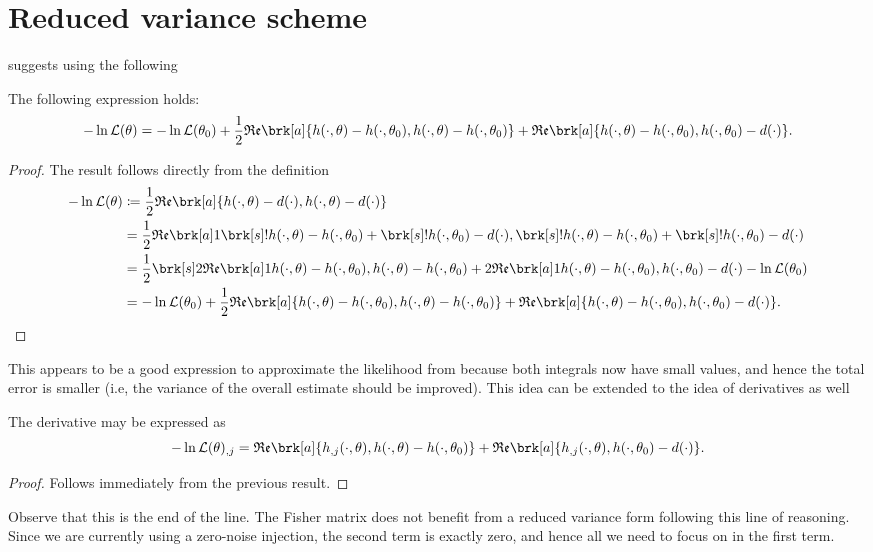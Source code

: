 \section{Reduced variance scheme}
\cite{Cornish_2021} suggests using the following
\begin{proposition}[]\label{}
The following expression holds:
\begin{equation}\label{}
- \ln \like(\theta) = -\ln \like(\theta_0) + \frac{1}{2} \re \brk[a]{h(\cdot,\theta) - h(\cdot,\theta_0), h(\cdot,\theta) - h(\cdot,\theta_0)} + \re \brk[a]{h(\cdot,\theta) - h(\cdot,\theta_0), h(\cdot,\theta_0) - d(\cdot)}.
\end{equation}
\end{proposition}
\begin{proof}
The result follows directly from the definition
\begin{align*}
-\ln \like(\theta) &\defn \frac{1}{2} \re \brk[a]{h(\cdot,\theta) - d(\cdot), h(\cdot,\theta)-d(\cdot)} \\
&= \frac{1}{2} \re \brk[a]1{\brk[s]!{h(\cdot,\theta) - h(\cdot,\theta_0)} + \brk[s]!{h(\cdot, \theta_0) - d(\cdot)}, \brk[s]!{h(\cdot, \theta) - h(\cdot,\theta_0)} + \brk[s]!{h(\cdot,\theta_0) - d(\cdot)}} \\
&= \frac{1}{2} \brk[s]2{\re \brk[a]1{h(\cdot,\theta) - h(\cdot,\theta_0), h(\cdot,\theta) - h(\cdot,\theta_0)} + 2 \re \brk[a]1{h(\cdot,\theta) - h(\cdot,\theta_0), h(\cdot,\theta_0) - d(\cdot)}} - \ln \like (\theta_0) \\
&= -\ln \like(\theta_0) + \frac{1}{2} \re \brk[a]{h(\cdot,\theta) - h(\cdot,\theta_0), h(\cdot,\theta) - h(\cdot,\theta_0)} + \re \brk[a]{h(\cdot,\theta) - h(\cdot,\theta_0), h(\cdot,\theta_0) - d(\cdot)}.
\end{align*}
\end{proof}
This appears to be a good expression to approximate the likelihood from because both integrals now have small values, and hence the total error is smaller (i.e, the variance of the overall estimate should be improved).
This idea can be extended to the idea of derivatives as well
\begin{corollary}[]\label{}
The derivative may be expressed as
\begin{equation}\label{}
- \ln \like(\theta)_{,j} = \re \brk[a]{h_{,j}(\cdot,\theta), h(\cdot,\theta) - h(\cdot, \theta_0)} + \re \brk[a]{h_{,j}(\cdot,\theta), h(\cdot,\theta_0) - d(\cdot)}.
\end{equation}
\end{corollary}
\begin{proof}
Follows immediately from the previous result.
\end{proof}
Observe that this is the end of the line.
The Fisher matrix does not benefit from a reduced variance form following this line of reasoning.
Since we are currently using a zero-noise injection, the second term is exactly zero, and hence all we need to focus on in the first term.
